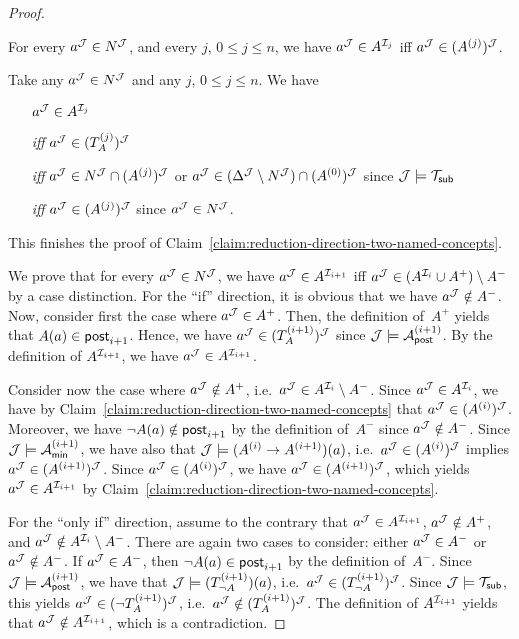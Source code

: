 \begin{proof}
    \begin{claim}\label{claim:reduction-direction-two-named-concepts}
        For every $a^\mathcal{J}\in N^\mathcal{J}$, and every $j$, $0\le j\le n$, we have
        $a^\mathcal{J}\in A^{\mathcal{I}_j}$ iff $a^\mathcal{J}\in(A^{(j)})^\mathcal{J}$.
    \end{claim}

    \noindent
    Take any $a^\mathcal{J}\in N^\mathcal{J}$ and any $j$, $0\le j\le n$.  We have
    \begin{itemize}
        \item[]
            $a^\mathcal{J}\in A^{\mathcal{I}_j}$
        \item[\emph{iff}]
            $a^\mathcal{J}\in(T_A^{(j)})^\mathcal{J}$
        \item[\emph{iff}]
            $a^\mathcal{J}\in N^\mathcal{J}\cap(A^{(j)})^\mathcal{J}$ or
            $a^\mathcal{J}\in(\Delta^\mathcal{J}\setminus N^\mathcal{J})\cap(A^{(0)})^\mathcal{J}$ since
            $\mathcal{J}\models\mathcal{T}_\mathsf{sub}$
        \item[\emph{iff}]
            $a^\mathcal{J}\in(A^{(j)})^\mathcal{J}$ since $a^\mathcal{J}\in N^\mathcal{J}$.
    \end{itemize}
    This finishes the proof of
    Claim~\ref{claim:reduction-direction-two-named-concepts}.

    We prove that for every $a^\mathcal{J}\in N^\mathcal{J}$, we have
    $a^\mathcal{J}\in A^{\mathcal{I}_{i+1}}$ iff $a^\mathcal{J}\in(A^{\mathcal{I}_i}\cup A^+)\setminus A^-$
    by a case distinction.
    For the \enquote{if} direction, it is obvious that we have
    $a^\mathcal{J}\notin A^-$.
    Now, consider first the case where $a^\mathcal{J}\in A^+$.  Then, the definition
    of~$A^+$ yields that $A(a)\in\mathsf{post}_{i+1}$.  Hence, we have
    $a^\mathcal{J}\in(T_A^{(i+1)})^\mathcal{J}$ since $\mathcal{J}\models\mathcal{A}_\mathsf{post}^{(i+1)}$.  By the
    definition of $A^{\mathcal{I}_{i+1}}$, we have $a^\mathcal{J}\in A^{\mathcal{I}_{i+1}}$.

    Consider now the case where $a^\mathcal{J}\notin A^+$,
    i.e.~$a^\mathcal{J}\in A^{\mathcal{I}_i}\setminus A^-$.  Since $a^\mathcal{J}\in A^{\mathcal{I}_i}$, we
    have by
    Claim~\ref{claim:reduction-direction-two-named-concepts} that
    $a^\mathcal{J}\in(A^{(i)})^\mathcal{J}$.  Moreover, we have $\lnot A(a)\notin\mathsf{post}_{i+1}$
    by the definition of~$A^-$ since $a^\mathcal{J}\notin A^-$.  Since
    $\mathcal{J}\models\mathcal{A}_\mathsf{min}^{(i+1)}$, we have also that
    $\mathcal{J}\models(A^{(i)}\to A^{(i+1)})(a)$,
    i.e.~$a^\mathcal{J}\in(A^{(i)})^\mathcal{J}$ implies $a^\mathcal{J}\in(A^{(i+1)})^\mathcal{J}$.  Since
    $a^\mathcal{J}\in(A^{(i)})^\mathcal{J}$, we have $a^\mathcal{J}\in(A^{(i+1)})^\mathcal{J}$, which yields
    $a^\mathcal{J}\in A^{\mathcal{I}_{i+1}}$ by
    Claim~\ref{claim:reduction-direction-two-named-concepts}.

    For the \enquote{only if} direction, assume to the contrary that
    $a^\mathcal{J}\in A^{\mathcal{I}_{i+1}}$, $a^\mathcal{J}\notin A^+$, and
    $a^\mathcal{J}\notin A^{\mathcal{I}_i}\setminus A^-$.  There are again two cases to
    consider: either $a^\mathcal{J}\in A^-$ or $a^\mathcal{J}\notin A^-$.  If $a^\mathcal{J}\in A^-$,
    then $\lnot A(a)\in\mathsf{post}_{i+1}$ by the definition of~$A^-$.  Since
    $\mathcal{J}\models\mathcal{A}_\mathsf{post}^{(i+1)}$, we have that
    $\mathcal{J}\models(T_{\lnot A}^{(i+1)})(a)$,
    i.e.~$a^\mathcal{J}\in(T_{\lnot A}^{(i+1)})^\mathcal{J}$.  Since $\mathcal{J}\models\mathcal{T}_\mathsf{sub}$, this
    yields $a^\mathcal{J}\in(\lnot T_A^{(i+1)})^\mathcal{J}$,
    i.e.~$a^\mathcal{J}\notin(T_A^{(i+1)})^\mathcal{J}$.  The definition of $A^{\mathcal{I}_{i+1}}$
    yields that $a^\mathcal{J}\notin A^{\mathcal{I}_{i+1}}$, which is a contradiction.


\end{proof}
